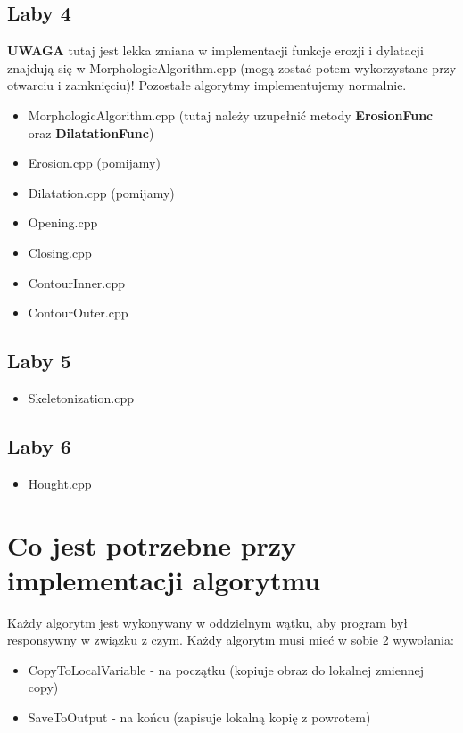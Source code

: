 \documentclass{article}
\begin{document}
\subsection{Laby 4}
\textbf{UWAGA} tutaj jest lekka zmiana w implementacji funkcje erozji i dylatacji znajdują się w MorphologicAlgorithm.cpp (mogą zostać potem wykorzystane przy otwarciu i zamknięciu)! Pozostałe algorytmy implementujemy normalnie.
\begin{itemize}
    \item MorphologicAlgorithm.cpp (tutaj należy uzupełnić metody \textbf{ErosionFunc} oraz \textbf{DilatationFunc})
    \item Erosion.cpp (pomijamy)
    \item Dilatation.cpp (pomijamy)
    \item Opening.cpp
    \item Closing.cpp
    \item ContourInner.cpp
    \item ContourOuter.cpp
\end{itemize}

\subsection{Laby 5}
\begin{itemize}
    \item Skeletonization.cpp
\end{itemize}

\subsection{Laby 6}
\begin{itemize}
    \item Hought.cpp
\end{itemize}


\section{Co jest potrzebne przy implementacji algorytmu}
Każdy algorytm jest wykonywany w oddzielnym wątku, aby program był responsywny w związku z czym.
Każdy algorytm musi mieć w sobie 2 wywołania:
\begin{itemize}
    \item CopyToLocalVariable - na początku (kopiuje obraz do lokalnej zmiennej copy)
    \item SaveToOutput - na końcu (zapisuje lokalną kopię z powrotem)
\end{itemize}
\end{document}
